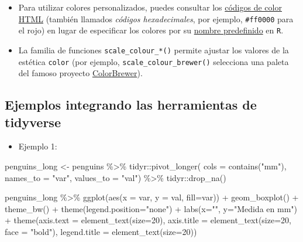 \documentclass[
  letterpaper,
  DIV=11,
  numbers=noendperiod]{scrreprt}
\newenvironment{Shaded}{\begin{snugshade}}{\end{snugshade}}
\newcommand{\AttributeTok}[1]{\textcolor[rgb]{0.40,0.45,0.13}{#1}}
\newcommand{\DecValTok}[1]{\textcolor[rgb]{0.68,0.00,0.00}{#1}}
\newcommand{\FunctionTok}[1]{\textcolor[rgb]{0.28,0.35,0.67}{#1}}
\newcommand{\NormalTok}[1]{\textcolor[rgb]{0.00,0.23,0.31}{#1}}
\newcommand{\OtherTok}[1]{\textcolor[rgb]{0.00,0.23,0.31}{#1}}
\newcommand{\SpecialCharTok}[1]{\textcolor[rgb]{0.37,0.37,0.37}{#1}}
\newcommand{\StringTok}[1]{\textcolor[rgb]{0.13,0.47,0.30}{#1}}
\providecommand{\tightlist}{%
  \setlength{\itemsep}{0pt}\setlength{\parskip}{0pt}}\usepackage{longtable,booktabs,array}
\begin{document}
\begin{itemize}
\item
  Para utilizar colores personalizados, puedes consultar los
  \href{https://www.w3schools.com/colors/colors_picker.asp}{códigos de
  color HTML} (también llamados \emph{códigos hexadecimales}, por
  ejemplo, \texttt{\#ff0000} para el rojo) en lugar de especificar los
  colores por su
  \href{http://sape.inf.usi.ch/quick-reference/ggplot2/colour}{nombre
  predefinido} en \texttt{R}.
\item
  La familia de funciones \texttt{scale\_colour\_*()} permite ajustar
  los valores de la estética \texttt{color} (por ejemplo,
  \texttt{scale\_colour\_brewer()} selecciona una paleta del famoso
  proyecto
  \href{https://colorbrewer2.org/\#type=sequential&scheme=BuGn&n=3}{ColorBrewer}).
\end{itemize}

\subsection{Ejemplos integrando las herramientas de
tidyverse}\label{ejemplos-integrando-las-herramientas-de-tidyverse}

\begin{itemize}
\tightlist
\item
  Ejemplo 1:
\end{itemize}

\begin{Shaded}
\begin{Highlighting}[]
\NormalTok{penguins\_long }\OtherTok{\textless{}{-}}\NormalTok{ penguins }\SpecialCharTok{\%\textgreater{}\%} 
\NormalTok{  tidyr}\SpecialCharTok{::}\FunctionTok{pivot\_longer}\NormalTok{(}
    \AttributeTok{cols =} \FunctionTok{contains}\NormalTok{(}\StringTok{"mm"}\NormalTok{),}
    \AttributeTok{names\_to =} \StringTok{"var"}\NormalTok{, }\AttributeTok{values\_to =} \StringTok{"val"}\NormalTok{) }\SpecialCharTok{\%\textgreater{}\%} 
\NormalTok{  tidyr}\SpecialCharTok{::}\FunctionTok{drop\_na}\NormalTok{()}

\NormalTok{penguins\_long }\SpecialCharTok{\%\textgreater{}\%} 
  \FunctionTok{ggplot}\NormalTok{(}\FunctionTok{aes}\NormalTok{(}\AttributeTok{x =}\NormalTok{ var, }\AttributeTok{y =}\NormalTok{ val, }\AttributeTok{fill=}\NormalTok{var)) }\SpecialCharTok{+}
  \FunctionTok{geom\_boxplot}\NormalTok{() }\SpecialCharTok{+}
  \FunctionTok{theme\_bw}\NormalTok{() }\SpecialCharTok{+}
  \FunctionTok{theme}\NormalTok{(}\AttributeTok{legend.position=}\StringTok{"none"}\NormalTok{) }\SpecialCharTok{+}
  \FunctionTok{labs}\NormalTok{(}\AttributeTok{x=}\StringTok{""}\NormalTok{, }\AttributeTok{y=}\StringTok{"Medida en mm"}\NormalTok{) }\SpecialCharTok{+}
  \FunctionTok{theme}\NormalTok{(}\AttributeTok{axis.text =} \FunctionTok{element\_text}\NormalTok{(}\AttributeTok{size=}\DecValTok{20}\NormalTok{),}
\AttributeTok{axis.title =} \FunctionTok{element\_text}\NormalTok{(}\AttributeTok{size=}\DecValTok{20}\NormalTok{, }\AttributeTok{face =} \StringTok{"bold"}\NormalTok{),}
\AttributeTok{legend.title =} \FunctionTok{element\_text}\NormalTok{(}\AttributeTok{size=}\DecValTok{20}\NormalTok{))}
\end{Highlighting}
\end{Shaded}
\end{document}
